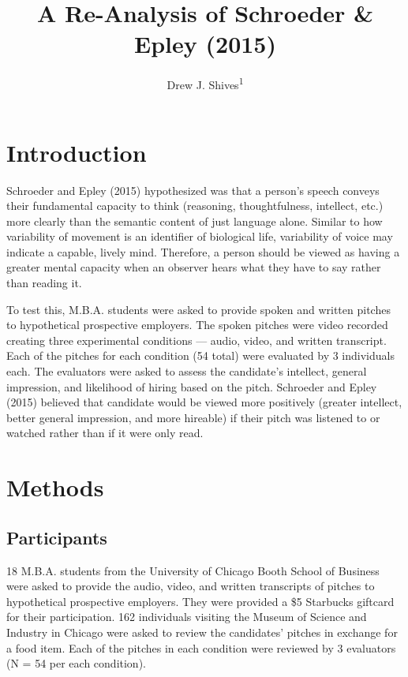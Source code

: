 \documentclass[
  english,
  man]{apa6}
\title{A Re-Analysis of Schroeder \& Epley (2015)}
\author{Drew J. Shives\textsuperscript{1}}
\date{}
\affiliation{\vspace{0.5cm}\textsuperscript{1} The Graduate Center of the City University of New York}
\begin{document}
\maketitle

\hypertarget{introduction}{%
\section{Introduction}\label{introduction}}

Schroeder and Epley (2015) hypothesized was that a person's speech conveys their fundamental capacity to think (reasoning, thoughtfulness, intellect, etc.) more clearly than the semantic content of just language alone. Similar to how variability of movement is an identifier of biological life, variability of voice may indicate a capable, lively mind. Therefore, a person should be viewed as having a greater mental capacity when an observer hears what they have to say rather than reading it.

To test this, M.B.A. students were asked to provide spoken and written pitches to hypothetical prospective employers. The spoken pitches were video recorded creating three experimental conditions --- audio, video, and written transcript. Each of the pitches for each condition (54 total) were evaluated by 3 individuals each. The evaluators were asked to assess the candidate's intellect, general impression, and likelihood of hiring based on the pitch. Schroeder and Epley (2015) believed that candidate would be viewed more positively (greater intellect, better general impression, and more hireable) if their pitch was listened to or watched rather than if it were only read.

\hypertarget{methods}{%
\section{Methods}\label{methods}}

\hypertarget{participants}{%
\subsection{Participants}\label{participants}}

18 M.B.A. students from the University of Chicago Booth School of Business were asked to provide the audio, video, and written transcripts of pitches to hypothetical prospective employers. They were provided a \$5 Starbucks giftcard for their participation. 162 individuals visiting the Museum of Science and Industry in Chicago were asked to review the candidates' pitches in exchange for a food item. Each of the pitches in each condition were reviewed by 3 evaluators (N = 54 per each condition).
\end{document}
